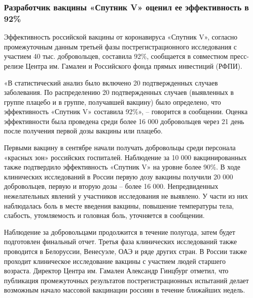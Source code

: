  
 
 


\subsubsection{Разработчик вакцины «Спутник V» оценил ее эффективность в 92\%}

Эффективность российской вакцины от коронавируса «Спутник V», согласно
промежуточным данным третьей фазы пострегистрационного исследования с
участием 40 тыс. добровольцев, составила 92\%, сообщается в совместном
пресс-релизе Центра им. Гамалеи и Российского фонда прямых инвестиций
(РФПИ).

«В статистический анализ было включено 20 подтвержденных случаев
заболевания. По распределению 20 подтвержденных случаев (выявленных в
группе плацебо и в группе, получавшей вакцину) было определено, что
эффективность «Спутник V» составила 92\%», – говорится в сообщении. Оценка
эффективности была проведена среди более 16 000 добровольцев через 21 день
после получения первой дозы вакцины или плацебо.

Первыми вакцину в сентябре начали получать добровольцы среди персонала
«красных зон» российских госпиталей. Наблюдение за 10 000 вакцинированных
также подтвердило эффективность «Спутник V» на уровне более 90\%. В ходе
клинических исследований в России первую дозу вакцины получили 20 000
добровольцев, первую и вторую дозы – более 16 000. Непредвиденных
нежелательных явлений у участников исследования не выявлено. У части из
них наблюдалась боль в месте введения вакцины, повышение температуры тела,
слабость, утомляемость и головная боль, уточняется в сообщении.

Наблюдение за добровольцами продолжится в течение полугода, затем будет
подготовлен финальный отчет. Третья фаза клинических исследований также
проводится в Белоруссии, Венесуэле, ОАЭ и ряде других стран. В России
также проходит клиническое исследование вакцины с участием людей старшего
возраста. Директор Центра им. Гамалеи Александр Гинцбург отметил, что
публикация промежуточных результатов пострегистрационных испытаний делает
возможным начало массовой вакцинации россиян в течение ближайших недель.

